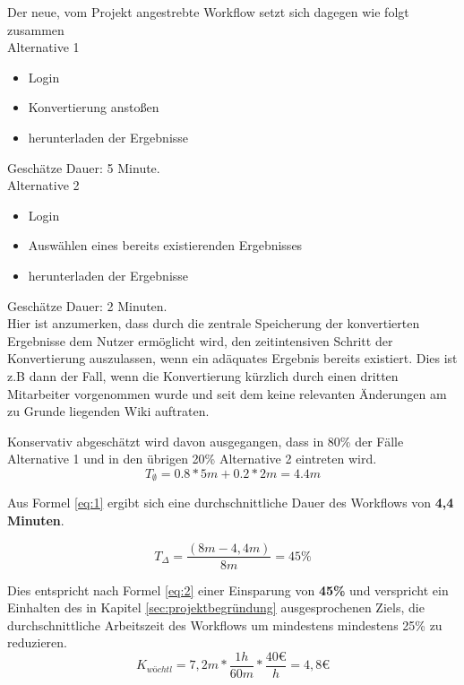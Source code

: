 \documentclass[12pt, xcolor=dvipsnames]{scrartcl}
\begin{document}
Der neue, vom Projekt angestrebte Workflow setzt sich dagegen wie folgt zusammen \\

Alternative 1
\begin{itemize}
	\item Login
	\item Konvertierung anstoßen
	\item herunterladen der Ergebnisse
\end{itemize}
Geschätze Dauer: 5 Minute. \\

Alternative 2
\begin{itemize}
	\item Login
	\item Auswählen eines bereits existierenden Ergebnisses
	\item herunterladen der Ergebnisse
\end{itemize}
Geschätze Dauer: 2 Minuten. \\


Hier ist anzumerken, dass durch die zentrale Speicherung der konvertierten Ergebnisse dem Nutzer ermöglicht wird, den zeitintensiven Schritt der Konvertierung auszulassen, wenn ein adäquates Ergebnis bereits existiert. Dies ist z.B dann der Fall, wenn die Konvertierung kürzlich durch einen dritten Mitarbeiter vorgenommen wurde und seit dem keine relevanten Änderungen am zu Grunde liegenden Wiki auftraten.

Konservativ abgeschätzt wird davon ausgegangen, dass in 80\% der Fälle Alternative 1 und in den übrigen 20\% Alternative 2 eintreten wird.
\begin{equation} \label{eq:1}
	T_\emptyset = 0.8 * 5m + 0.2* 2m = 4.4m
\end{equation}

Aus Formel \ref{eq:1} ergibt sich eine durchschnittliche Dauer des Workflows von \textbf{4,4 Minuten}.



\begin{equation} \label{eq:2}
	T_\Delta = \frac{(8m-4,4m)}{8m} = 45\%
\end{equation}

Dies entspricht nach Formel \ref{eq:2} einer Einsparung von \textbf{45\%} und verspricht ein Einhalten des in Kapitel \ref{sec:projektbegründung} ausgesprochenen Ziels, die durchschnittliche Arbeitszeit des Workflows um mindestens mindestens 25\% zu reduzieren. \\

\begin{equation} \label{eq:3}
	K_{wöchtl} = 7,2m * \frac{1h}{60m} * \frac{40 \euro}{h} = 4,8 \euro
\end{equation}
\end{document}
